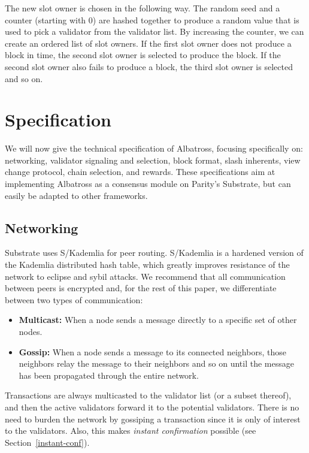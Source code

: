 \documentclass[conference]{IEEEtran}
\begin{document}
The new slot owner is chosen in the following way. The random seed and a counter (starting with $0$) are hashed together to produce a random value that is used to pick a validator from the validator list. By increasing the counter, we can create an ordered list of slot owners. If the first slot owner does not produce a block in time, the second slot owner is selected to produce the block. If the second slot owner also fails to produce a block, the third slot owner is selected and so on.

\section{Specification}
\label{sec:specification}
We will now give the technical specification of Albatross, focusing specifically on: networking, validator signaling and selection, block format, slash inherents, view change protocol, chain selection, and rewards. These specifications aim at implementing Albatross as a consensus module on Parity's Substrate, but can easily be adapted to other frameworks.

\subsection{Networking}
Substrate uses S/Kademlia \cite{baumgart2007s} for peer routing. S/Kademlia is a hardened version of the Kademlia distributed hash table, which greatly improves resistance of the network to eclipse and sybil attacks. We recommend that all communication between peers is encrypted and, for the rest of this paper, we differentiate between two types of communication:

\begin{itemize}
	\item \textbf{Multicast:} When a node sends a message directly to a specific set of other nodes.
	\item  \textbf{Gossip:} When a node sends a message to its connected neighbors, those neighbors relay the message to their neighbors and so on until the message has been propagated through the entire network.
\end{itemize}

Transactions are always multicasted to the validator list (or a subset thereof), and then the active validators forward it to the potential validators. There is no need to burden the network by gossiping a transaction since it is only of interest to the validators. Also, this makes \textit{instant confirmation} possible (see Section~\ref{instant-conf}).
\end{document}
